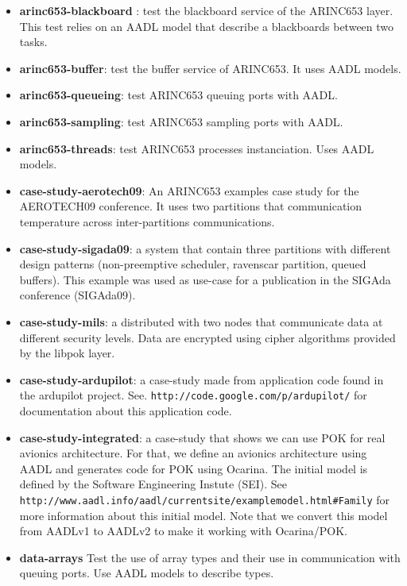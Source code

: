 \begin{itemize}
   \item
      \textbf{arinc653-blackboard} :
         test the blackboard service
         of the ARINC653 layer. This test relies on an AADL
         model that describe a blackboards between two tasks.
   
   \item
      \textbf{arinc653-buffer}:
         test the buffer service of ARINC653.
         It uses AADL models.

   \item
      \textbf{arinc653-queueing}:
         test ARINC653 queuing ports with AADL.

   \item
      \textbf{arinc653-sampling}:
         test ARINC653 sampling ports with AADL.

   \item
      \textbf{arinc653-threads}:
         test ARINC653 processes instanciation.
         Uses AADL models.

   \item
      \textbf{case-study-aerotech09}:
         An ARINC653 examples case study
         for the AEROTECH09 conference. It uses two partitions
         that communication temperature across inter-partitions
         communications.
   \item
      \textbf{case-study-sigada09}: a system that contain three partitions
      with different design patterns (non-preemptive scheduler,
      ravenscar partition, queued buffers). This example was used
      as use-case for a publication in the SIGAda conference (SIGAda09).
   \item
      \textbf{case-study-mils}: a distributed with two nodes that communicate
      data at different security levels. Data are encrypted using cipher
      algorithms provided by the libpok layer. 
   \item
      \textbf{case-study-ardupilot}: a case-study made from application code
      found in the ardupilot project. See.
      \texttt{http://code.google.com/p/ardupilot/} for documentation about this
      application code.
   \item
      \textbf{case-study-integrated}: a case-study that shows we can use POK for
      real avionics architecture. For that, we define an avionics architecture
      using AADL and generates code for POK using Ocarina. The initial model is
      defined by the Software Engineering Instute (SEI). See
      \texttt{http://www.aadl.info/aadl/currentsite/examplemodel.html\#Family}
      for more information about this initial model. Note that we convert this
      model from AADLv1 to AADLv2 to make it working with Ocarina/POK.
   \item
      \textbf{data-arrays}
         Test the use of array types and their use
         in communication with queuing ports. Use AADL
         models to describe types.


\end{itemize}
